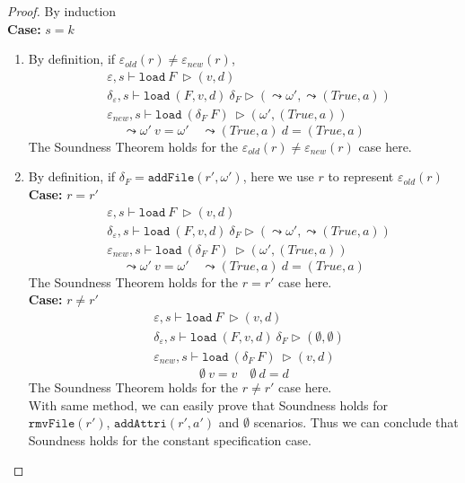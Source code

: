 \documentclass[10pt,twoside,a4paper]{article}
\theoremstyle{theorem}
\theoremstyle{lemma}
\theoremstyle{property}
\theoremstyle{definition}
\theoremstyle{assumption}
\begin{document}
\begin{proof}
	By induction\\
	\textbf{Case: } $s = k$\\
	\begin{enumerate}
	\item
	By definition, if $\varepsilon_{old}(r) \not= \varepsilon_{new}(r)$,
	\begin{align*}
			& \varepsilon, s \vdash \mathtt{load}~ F~ \rhd (v,d)\\
			& \delta_\varepsilon, s \vdash \mathtt{load}~ (F,v,d)~ \delta_F \rhd (\leadsto \omega', \leadsto (True, a))\\
			& \varepsilon_{new}, s \vdash \mathtt{load}~ (\delta_F~F)~ \rhd (\omega', (True, a))
	\end{align*}
	\begin{displaymath}
		\leadsto \omega' ~v = \omega' \quad \leadsto (True, a) ~d = (True, a)
	\end{displaymath}
	The Soundness Theorem holds for the $\varepsilon_{old}(r) \not= \varepsilon_{new}(r)$ case here. \\

	\item
	By definition, if $\delta_F = \mathtt{addFile}(r',\omega')$, here we use $r$ to represent $\varepsilon_{old}(r)$ \\
	\textbf{Case: } $r = r'$
	\begin{align*}
			& \varepsilon, s \vdash \mathtt{load}~ F~ \rhd (v,d)\\
			& \delta_\varepsilon, s \vdash \mathtt{load}~ (F,v,d)~ \delta_F \rhd (\leadsto \omega', \leadsto (True, a))\\
			& \varepsilon_{new}, s \vdash \mathtt{load}~ (\delta_F~F)~ \rhd (\omega', (True, a))
	\end{align*}
	\begin{displaymath}
		\leadsto \omega' ~v = \omega' \quad \leadsto (True, a) ~d = (True, a)
	\end{displaymath}
	The Soundness Theorem holds for the $r = r'$ case here. \\
	\textbf{Case: } $r \not= r'$
	\begin{align*}
			& \varepsilon, s \vdash \mathtt{load}~ F~ \rhd (v,d)\\
			& \delta_\varepsilon, s \vdash \mathtt{load}~ (F,v,d)~ \delta_F \rhd (\emptyset, \emptyset)\\
			& \varepsilon_{new}, s \vdash \mathtt{load}~ (\delta_F~F)~ \rhd (v,d)
	\end{align*}
	\begin{displaymath}
		\emptyset ~v = v \quad \emptyset ~d = d
	\end{displaymath}
	The Soundness Theorem holds for the $r \not= r'$ case here.\\
	With same method, we can easily prove that Soundness holds for $\mathtt{rmvFile}(r')$, $\mathtt{addAttri}(r', a')$ and $\emptyset$ scenarios. Thus we can conclude that Soundness holds for the constant specification case.
	\end{enumerate}
	

\end{proof}
\end{document}
